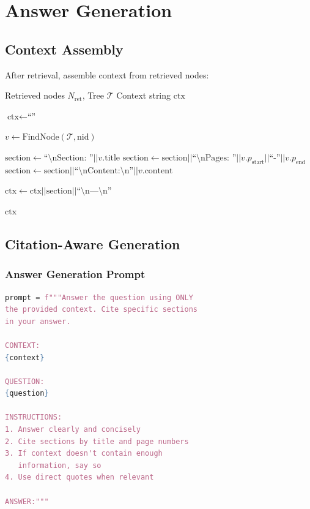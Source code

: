 \section{Answer Generation}

\subsection{Context Assembly}

After retrieval, assemble context from retrieved nodes:

\begin{algorithm}[H]
\caption{Assemble Context}
\begin{algorithmic}[1]
\Require Retrieved nodes $N_{\text{ret}}$, Tree $\mathcal{T}$
\Ensure Context string $\text{ctx}$

\State $\text{ctx} \gets \text{``''}$

    \State $v \gets \text{FindNode}(\mathcal{T}, \text{nid})$
    
    \State $\text{section} \gets \text{``\textbackslash nSection: ''} || v.\text{title}$
    \State $\text{section} \gets \text{section} || \text{``\textbackslash nPages: ''} || v.p_{\text{start}} || \text{``-''} || v.p_{\text{end}}$
    \State $\text{section} \gets \text{section} || \text{``\textbackslash nContent:\textbackslash n''} || v.\text{content}$
    
    \State $\text{ctx} \gets \text{ctx} || \text{section} || \text{``\textbackslash n---\textbackslash n''}$
\EndFor

\State \Return $\text{ctx}$
\end{algorithmic}
\end{algorithm}

\subsection{Citation-Aware Generation}

\subsubsection{Answer Generation Prompt}

\begin{lstlisting}[language=Python, caption=Answer Generation Template]
prompt = f"""Answer the question using ONLY
the provided context. Cite specific sections
in your answer.

CONTEXT:
{context}

QUESTION:
{question}

INSTRUCTIONS:
1. Answer clearly and concisely
2. Cite sections by title and page numbers
3. If context doesn't contain enough
   information, say so
4. Use direct quotes when relevant

ANSWER:"""
\end{lstlisting}

